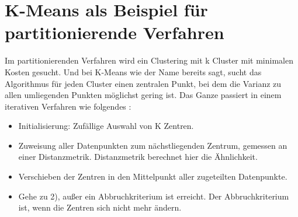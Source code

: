 \documentclass[runningheads]{llncs}
\begin{document}
\section{K-Means als Beispiel für partitionierende Verfahren}
Im partitionierenden Verfahren wird ein Clustering mit k Cluster mit minimalen Kosten gesucht. Und bei K-Means wie der Name bereits sagt, sucht das Algorithmus für jeden Cluster einen zentralen Punkt, bei dem die Varianz zu allen umliegenden Punkten möglichst gering ist.
Das Ganze passiert in einem iterativen Verfahren wie folgendes \cite{onlinequelle1}:
\begin{itemize}
	\item Initialisierung: Zufällige Auswahl von K Zentren. 
	\item Zuweisung aller Datenpunkten zum nächstliegenden Zentrum, gemessen an einer Distanzmetrik. Distanzmetrik berechnet hier die Ähnlichkeit. 
	\item Verschieben der Zentren in den Mittelpunkt aller zugeteilten Datenpunkte.
	\item Gehe zu 2), außer ein Abbruchkriterium ist erreicht. Der Abbruchkriterium ist, wenn die Zentren sich nicht mehr ändern.    
\end{itemize}
\end{document}
